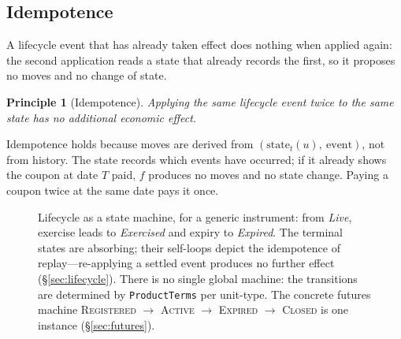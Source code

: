 \documentclass[11pt,a4paper]{article}
\newtheorem{principle}[definition]{Principle}
\begin{document}
\subsection{Idempotence}

A lifecycle event that has already taken effect does nothing when applied again: the second application reads a state that already records the first, so it proposes no moves and no change of state.

\begin{principle}[Idempotence]
\label{prin:idempotence}
Applying the same lifecycle event twice to the same state has no additional economic effect.
\end{principle}

Idempotence holds because moves are derived from $(\text{state}_t(u),\ \text{event})$, not from history. The state records which events have occurred; if it already shows the coupon at date $T$ paid, $f$ produces no moves and no state change. Paying a coupon twice at the same date pays it once.

\begin{figure}[tb]
\centering
{}
\caption{Lifecycle as a state machine, for a generic instrument: from \emph{Live}, exercise
leads to \emph{Exercised} and expiry to \emph{Expired}. The terminal states are absorbing;
their self-loops depict the idempotence of replay---re-applying a settled event produces no
further effect (\S\ref{sec:lifecycle}). There is no single global machine: the transitions
are determined by \texttt{ProductTerms} per unit-type. The concrete futures machine
\textsc{Registered} $\to$ \textsc{Active} $\to$ \textsc{Expired} $\to$ \textsc{Closed} is one
instance (\S\ref{sec:futures}).}
\label{fig:lifecycle}
\end{figure}
\end{document}
